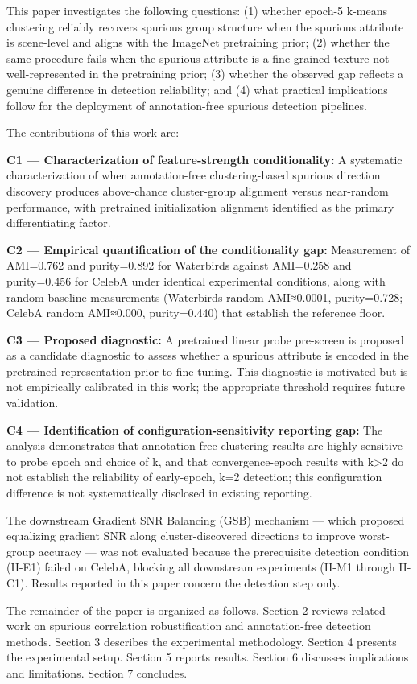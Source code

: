 This paper investigates the following questions: (1) whether epoch-5 k-means clustering reliably recovers spurious group structure when the spurious attribute is scene-level and aligns with the ImageNet pretraining prior; (2) whether the same procedure fails when the spurious attribute is a fine-grained texture not well-represented in the pretraining prior; (3) whether the observed gap reflects a genuine difference in detection reliability; and (4) what practical implications follow for the deployment of annotation-free spurious detection pipelines.

The contributions of this work are:

\textbf{C1 — Characterization of feature-strength conditionality:} A systematic characterization of when annotation-free clustering-based spurious direction discovery produces above-chance cluster-group alignment versus near-random performance, with pretrained initialization alignment identified as the primary differentiating factor.

\textbf{C2 — Empirical quantification of the conditionality gap:} Measurement of AMI=0.762 and purity=0.892 for Waterbirds against AMI=0.258 and purity=0.456 for CelebA under identical experimental conditions, along with random baseline measurements (Waterbirds random AMI≈0.0001, purity=0.728; CelebA random AMI≈0.000, purity=0.440) that establish the reference floor.

\textbf{C3 — Proposed diagnostic:} A pretrained linear probe pre-screen is proposed as a candidate diagnostic to assess whether a spurious attribute is encoded in the pretrained representation prior to fine-tuning. This diagnostic is motivated but is not empirically calibrated in this work; the appropriate threshold requires future validation.

\textbf{C4 — Identification of configuration-sensitivity reporting gap:} The analysis demonstrates that annotation-free clustering results are highly sensitive to probe epoch and choice of k, and that convergence-epoch results with k>2 do not establish the reliability of early-epoch, k=2 detection; this configuration difference is not systematically disclosed in existing reporting.

The downstream Gradient SNR Balancing (GSB) mechanism — which proposed equalizing gradient SNR along cluster-discovered directions to improve worst-group accuracy — was not evaluated because the prerequisite detection condition (H-E1) failed on CelebA, blocking all downstream experiments (H-M1 through H-C1). Results reported in this paper concern the detection step only.

The remainder of the paper is organized as follows. Section 2 reviews related work on spurious correlation robustification and annotation-free detection methods. Section 3 describes the experimental methodology. Section 4 presents the experimental setup. Section 5 reports results. Section 6 discusses implications and limitations. Section 7 concludes.

